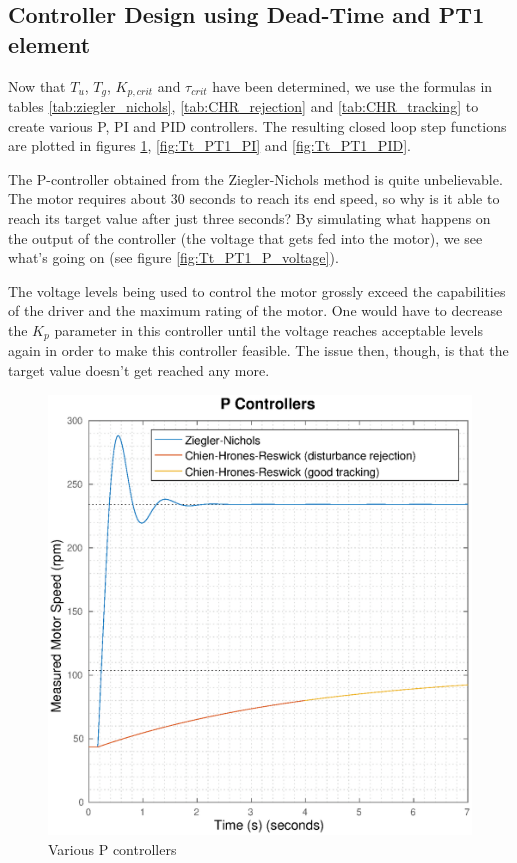 \subsection{Controller Design using Dead-Time and PT1 element}

Now that $T_u$, $T_g$, $K_{p,crit}$ and $\tau_{crit}$ have been determined, we
use the formulas  in tables \ref{tab:ziegler_nichols}, \ref{tab:CHR_rejection}
and \ref{tab:CHR_tracking} to create various  P,  PI  and PID controllers. The
resulting    closed   loop   step   functions   are   plotted    in    figures
\ref{fig:Tt_PT1_P},     \ref{fig:Tt_PT1_PI}      and     \ref{fig:Tt_PT1_PID}.


The  P-controller   obtained   from   the   Ziegler-Nichols  method  is  quite
unbelievable. The motor requires about 30  seconds  to reach its end speed, so
why is  it  able  to  reach  its  target  value  after  just three seconds? By
simulating what happens on the output of the controller (the voltage that gets
fed   into    the    motor),    we   see   what's   going   on   (see   figure
\ref{fig:Tt_PT1_P_voltage}).

The  voltage  levels  being  used  to  control the motor  grossly  exceed  the
capabilities of the driver and the maximum rating of the motor. One would have
to  decrease the $K_p$ parameter in this controller until the voltage  reaches
acceptable levels again in order to make this controller feasible.  The  issue
then,  though,  is  that  the  target  value  doesn't  get  reached  any more.

\begin{figure}[h]
    \centering
    \includegraphics[width=\imagewidth]{images/Tt_PT1_P}
    \caption{Various P controllers}
    \label{fig:Tt_PT1_P}
\end{figure}

